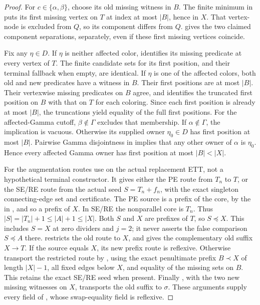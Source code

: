 \begin{proof}
For \(c\in\{\alpha,\beta\}\), choose its old missing witness in
\(B\). The finite minimum in
 puts its first missing vertex
on \(T\) at index at most \(|B|\), hence in \(X\). That vertex-node
is excluded from \(Q\), so its component differs from \(Q\).
 gives the two claimed component
separations, separately, even if these first missing vertices coincide.

Fix any \(\eta\in D\). If \(\eta\) is neither affected color,
 identifies its missing
predicate at every vertex of \(T\). The finite candidate sets for its
first position, and their terminal fallback when empty, are identical.
If \(\eta\) is one of the affected colors, both old and new predicates
have a witness in \(B\). Their first positions are at most \(|B|\).
Their vertexwise missing predicates on \(B\) agree, and
 identifies the
truncated first position on \(B\) with that on \(T\) for each
coloring. Since each first position is already at most \(|B|\), the
truncations yield equality of the full first positions.
For the affected-Gamma cutoff, \(\beta\notin\Gamma\) excludes that
membership. If \(\alpha\notin\Gamma\), the implication is vacuous.
Otherwise its supplied owner \(\eta_0\in D\) has first position
at most \(|B|\). Pairwise Gamma disjointness in
 implies that any other owner of \(\alpha\)
is \(\eta_0\). Hence every affected Gamma owner has first position
at most \(|B|<|X|\).

For the augmentation routes use  on
the actual replacement ETT, not a hypothetical terminal constructor.
It gives either the PE route from \(T_n\) to \(T\), or the SE/RE
route from the actual seed \(S=T_n+f_n\), with the exact singleton
connecting-edge set and  certificate.
The PE source is a prefix of the core, by the
 in , and so a
prefix of \(X\). In SE/RE the nonparallel core is \(T_n\).
Thus \(|S|=|T_n|+1\le |A|+1\le |X|\).
Both \(S\) and \(X\) are prefixes of \(T\), so \(S\preccurlyeq X\).
This includes \(S=X\) at zero dividers and \(j=2\); it never
asserts the false comparison \(S\preccurlyeq A\) there.
 restricts the old
route to \(X\), and 
gives the complementary old suffix \(X\to T\).
If the source equals \(X\), its new prefix route is reflexive.
Otherwise transport the restricted route by
, using the
exact penultimate prefix \(B\prec X\) of length \(|X|-1\),
all fixed edges below \(X\), and equality of the missing sets on
\(B\). This retains the exact SE/RE seed when present.
Finally , with
the two new missing witnesses on \(X\), transports the old suffix to
\(\sigma\). These arguments supply every field of
, whose swap-equality field is reflexive.
\end{proof}
